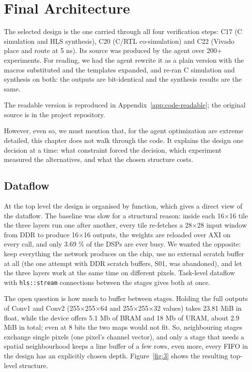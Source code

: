 \section{Final Architecture}\label{sec:4}

The selected design is the one carried through all four verification steps: C17 (C simulation and HLS synthesis), C20 (C/RTL co-simulation) and C22 (Vivado place and route at 5 ns). Its source was produced by the agent over 200+ experiments. For reading, we had the agent rewrite it as a plain version with the macros substituted and the templates expanded, and re-ran C simulation and synthesis on both: the outputs are bit-identical and the synthesis results are the same.

The readable version is reproduced in Appendix~\ref{app:code-readable}; the original source is  in the project repository.

However, even so, we must mention that, for the agent optimization are extreme detailed, this chapter does not walk through the code. It explains the design one decision at a time: what constraint forced the decision, which experiment measured the alternatives, and what the chosen structure costs.

\subsection{Dataflow}\label{sec:4.1}

At the top level the design is organised by function, which gives a direct view of the dataflow.  The baseline was slow for a structural reason: inside each 16$\times$16 tile the three layers run one after another, every tile re-fetches a 28$\times$28 input window from DDR to produce 16$\times$16 outputs, the weights are reloaded over AXI on every call, and only 3.69 \% of the DSPs are ever busy. We wanted the opposite: keep everything the network produces on the chip, use no external scratch buffer at all (the one attempt with DDR scratch buffers, S01, was abandoned), and let the three layers work at the same time on different pixels. Task-level dataflow with \texttt{hls::stream} connections between the stages gives both at once.

The open question is how much to buffer between stages. Holding the full outputs of Conv1 and Conv2 (255$\times$255$\times$64 and 255$\times$255$\times$32 values) takes 23.81 MiB in float, while the device offers 5.1 Mb of BRAM and 18 Mb of URAM, about 2.9 MiB in total; even at 8 bits the two maps would not fit. So, neighbouring stages exchange single pixels (one pixel's channel vector), and only a stage that needs a spatial neighbourhood keeps a line buffer of a few rows, even more, every FIFO in the design has an explicitly chosen depth. Figure~\ref{fig:3} shows the resulting top-level structure.

